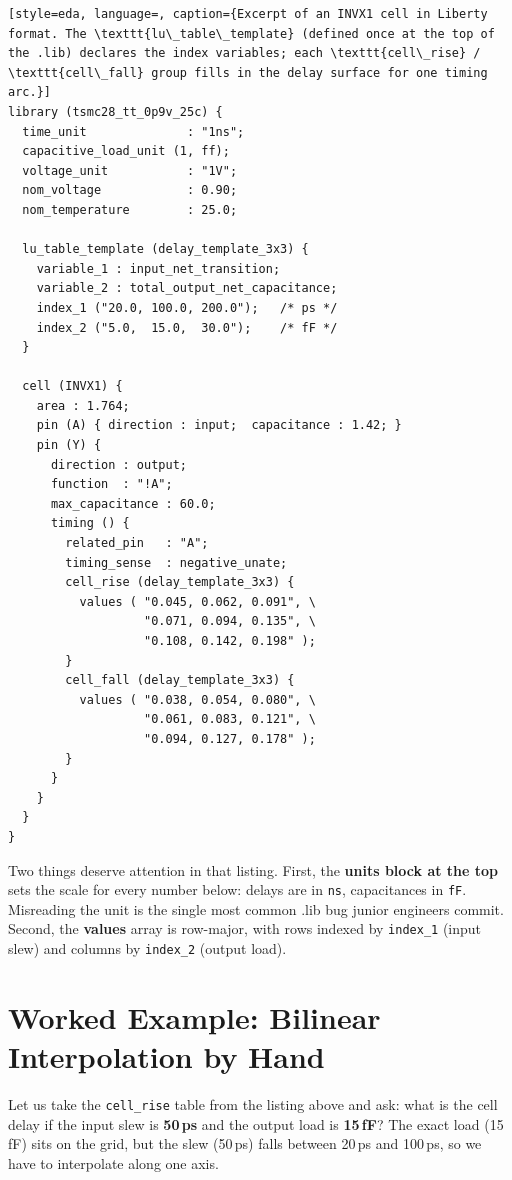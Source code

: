 \begin{lstlisting}[style=eda, language=, caption={Excerpt of an INVX1 cell in Liberty format. The \texttt{lu\_table\_template} (defined once at the top of the .lib) declares the index variables; each \texttt{cell\_rise} / \texttt{cell\_fall} group fills in the delay surface for one timing arc.}]
library (tsmc28_tt_0p9v_25c) {
  time_unit              : "1ns";
  capacitive_load_unit (1, ff);
  voltage_unit           : "1V";
  nom_voltage            : 0.90;
  nom_temperature        : 25.0;

  lu_table_template (delay_template_3x3) {
    variable_1 : input_net_transition;
    variable_2 : total_output_net_capacitance;
    index_1 ("20.0, 100.0, 200.0");   /* ps */
    index_2 ("5.0,  15.0,  30.0");    /* fF */
  }

  cell (INVX1) {
    area : 1.764;
    pin (A) { direction : input;  capacitance : 1.42; }
    pin (Y) {
      direction : output;
      function  : "!A";
      max_capacitance : 60.0;
      timing () {
        related_pin   : "A";
        timing_sense  : negative_unate;
        cell_rise (delay_template_3x3) {
          values ( "0.045, 0.062, 0.091", \
                   "0.071, 0.094, 0.135", \
                   "0.108, 0.142, 0.198" );
        }
        cell_fall (delay_template_3x3) {
          values ( "0.038, 0.054, 0.080", \
                   "0.061, 0.083, 0.121", \
                   "0.094, 0.127, 0.178" );
        }
      }
    }
  }
}
\end{lstlisting}

Two things deserve attention in that listing. First, the \textbf{units block at the top} sets the scale for every number below: delays are in \texttt{ns}, capacitances in \texttt{fF}. Misreading the unit is the single most common .lib bug junior engineers commit. Second, the \textbf{values} array is row-major, with rows indexed by \texttt{index\_1} (input slew) and columns by \texttt{index\_2} (output load).

\section{Worked Example: Bilinear Interpolation by Hand}

Let us take the \texttt{cell\_rise} table from the listing above and ask: what is the cell delay if the input slew is \textbf{50\,ps} and the output load is \textbf{15\,fF}? The exact load (15\,fF) sits on the grid, but the slew (50\,ps) falls between 20\,ps and 100\,ps, so we have to interpolate along one axis.

